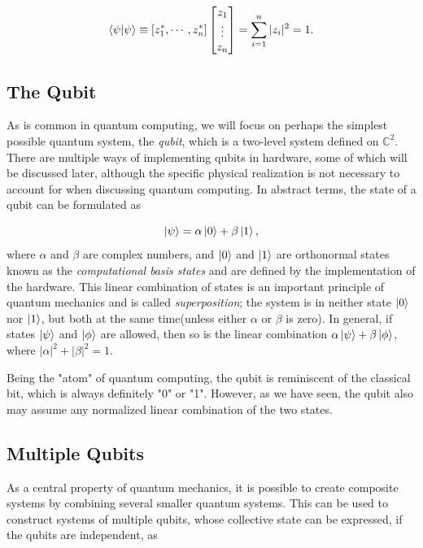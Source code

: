 \begin{equation}
    \braket{\psi}{\psi} \equiv [z_1^*, \cdots, z_n^*] 
    \begin{bmatrix}
        z_{1} \\
        \vdots \\
        z_{n}
    \end{bmatrix}
    = \sum_{i=1}^{n} |z_i|^2 = 1.
\end{equation}

\subsection{The Qubit}\label{sec:TheQubit}
As is common in quantum computing, we will focus on perhaps the simplest possible quantum system, the \emph{qubit}, which is a two-level system defined on $\mathbb{C}^2$.  There are multiple ways of implementing qubits in hardware, some of which will be discussed later, although  the specific physical realization is not necessary to account for when discussing quantum computing. In abstract terms, the state of a qubit can be formulated as

\begin{equation}
\ket{\psi} = \alpha \ket{0} + \beta \ket{1},
\end{equation}
where $\alpha$ and $\beta$ are complex numbers, and $\ket{0}$ and $\ket{1}$ are orthonormal states known as the \emph{computational basis states} and are defined by the implementation of the hardware. This linear combination of states is an important principle of quantum mechanics and is called \emph{superposition}; the system is in neither state $\ket{0}$ nor $\ket{1}$, but both at the same time(unless either $\alpha$ or $\beta$ is zero). In general, if states $\ket{\psi}$ and $\ket{\phi}$ are allowed, then so is the linear combination $\alpha \ket{\psi} + \beta \ket{\phi}$, where $|\alpha|^2 + |\beta|^2 = 1$.

Being the "atom" of quantum computing, the qubit is reminiscent of the classical bit, which is always definitely "0" or "1". However, as we have seen, the qubit also may assume any normalized linear combination of the two states.
\subsection{Multiple Qubits}\label{sec:Multiple Qubits}
As a central property of quantum mechanics, it is possible to create composite systems by combining several smaller quantum systems. This can be used to construct systems of multiple qubits, whose collective state can be expressed, if the qubits are independent, as


